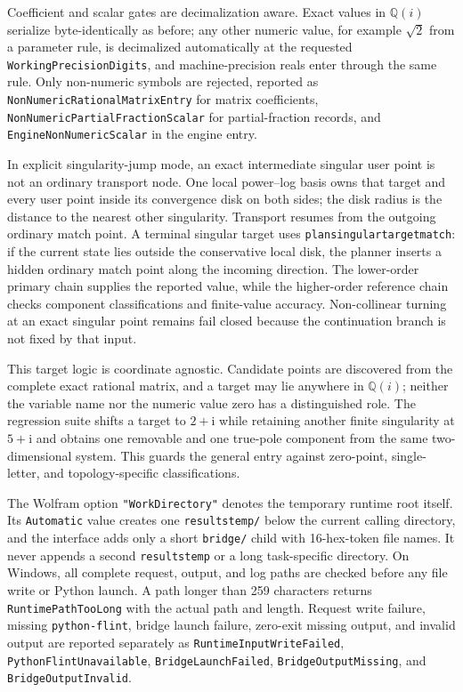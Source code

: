 \documentclass[11pt]{article}
\renewcommand{\_}{\origunderscore\allowbreak}
\begin{document}
Coefficient and scalar gates are decimalization aware.  Exact values in $\mathbb Q(i)$
serialize byte-identically as before; any other numeric value, for example $\sqrt2$ from a
parameter rule, is decimalized automatically at the requested \texttt{WorkingPrecisionDigits},
and machine-precision reals enter through the same rule.  Only non-numeric symbols are
rejected, reported as \texttt{NonNumericRationalMatrixEntry} for matrix coefficients,
\texttt{NonNumericPartialFractionScalar} for partial-fraction records, and
\texttt{EngineNonNumericScalar} in the engine entry.

In explicit singularity-jump mode, an exact intermediate singular user point is not an
ordinary transport node.  One local power--log basis owns that target and every user point
inside its convergence disk on both sides; the disk radius is the distance to the nearest
other singularity.  Transport resumes from the outgoing ordinary match point.  A terminal
singular target uses \texttt{plan\_singular\_target\_match}: if the current state lies outside
the conservative local disk, the planner inserts a hidden ordinary match point along the
incoming direction.  The lower-order primary chain supplies the reported value, while the
higher-order reference chain checks component classifications and finite-value accuracy.
Non-collinear turning at an exact singular point remains fail closed because the continuation
branch is not fixed by that input.

This target logic is coordinate agnostic. Candidate points are discovered from the complete exact
rational matrix, and a target may lie anywhere in $\mathbb Q(i)$; neither the variable name nor the
numeric value zero has a distinguished role. The regression suite shifts a target to $2+\mathrm{i}$ while
retaining another finite singularity at $5+\mathrm{i}$ and obtains one removable and one true-pole component
from the same two-dimensional system. This guards the general entry against zero-point, single-letter,
and topology-specific classifications.

The Wolfram option \texttt{"WorkDirectory"} denotes the temporary runtime root itself.
Its \texttt{Automatic} value creates one \texttt{results\_temp/} below the current calling
directory, and the interface adds only a short \texttt{bridge/} child with 16-hex-token file
names.  It never appends a second \texttt{results\_temp} or a long task-specific directory.
On Windows, all complete request, output, and log paths are checked before any file write or
Python launch.  A path longer than 259 characters returns
\texttt{RuntimePathTooLong} with the actual path and length.  Request write failure,
missing \texttt{python-flint}, bridge launch failure, zero-exit missing output, and invalid
output are reported separately as \texttt{RuntimeInputWriteFailed},
\texttt{PythonFlintUnavailable}, \texttt{BridgeLaunchFailed},
\texttt{BridgeOutputMissing}, and \texttt{BridgeOutputInvalid}.
\end{document}
